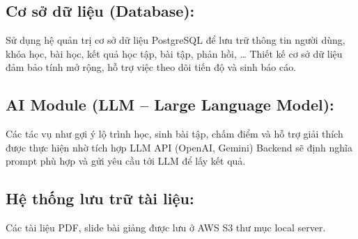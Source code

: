 \subsection{Cơ sở dữ liệu (Database):}
Sử dụng hệ quản trị cơ sở dữ liệu PostgreSQL để lưu trữ thông tin người dùng, khóa học, bài học, kết quả học tập, bài tập, phản hồi, \dots
Thiết kế cơ sở dữ liệu đảm bảo tính mở rộng, hỗ trợ việc theo dõi tiến độ và sinh báo cáo.

\subsection{AI Module (LLM – Large Language Model):}
Các tác vụ như gợi ý lộ trình học, sinh bài tập, chấm điểm và hỗ trợ giải thích được thực hiện nhờ tích hợp LLM API (OpenAI, Gemini)
Backend sẽ định nghĩa prompt phù hợp và gửi yêu cầu tới LLM để lấy kết quả.

\subsection{Hệ thống lưu trữ tài liệu:}
Các tài liệu PDF, slide bài giảng được lưu ở AWS S3 thư mục local server.




